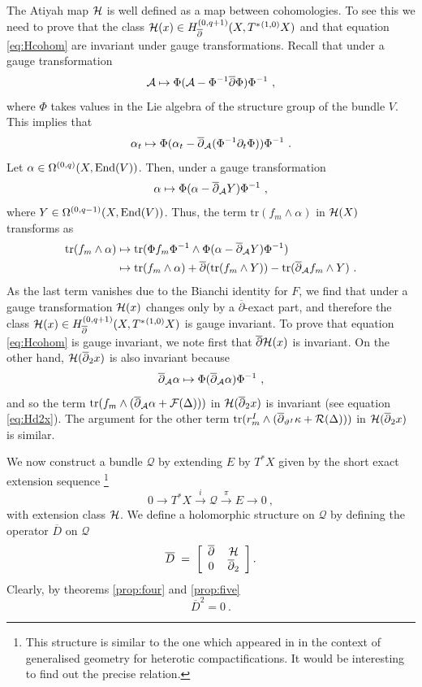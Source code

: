 \documentclass[12pt,a4paper]{article}
\def\bar#1{\overline{#1}}
\let\p=\partial
\def\bp{\bar{\partial}}
\def\tr{\textrm{tr}}
\def\Q{\mathcal{Q}}
\theoremstyle{definition}
\begin{document}
\vskip5pt
The Atiyah map $\cal H$ is well defined as a map between cohomologies.  To see this we need to prove that the class ${\cal H}(x)\in H_{\bp}^{(0,q+1)}(X, T^*{}^{(1,0)}X)$ and that equation \eqref{eq:Hcohom} are invariant under gauge transformations.
Recall that under a gauge transformation
\[ {\cal A} \mapsto \Phi({\cal A} - \Phi^{-1}\bp \Phi)\Phi^{-1}~,\]
where $\Phi$ takes values in the Lie algebra of the structure group of the bundle $V$.  This implies that
\[ \alpha_t \mapsto  \Phi(\alpha_t - \bp_{\cal A}(\Phi^{-1}\p_t \Phi))\Phi^{-1}~.\]
Let $\alpha\in\Omega^{(0,q)}(X, {\rm End}(V))$.  Then, under a gauge transformation
\[ \alpha \mapsto \Phi(\alpha - \bp_{\cal A}Y)\Phi^{-1}~,\]
where $Y\in\Omega^{(0,q-1)}(X, {\rm End}(V))$.  Thus, the term $\tr(f_m\wedge\alpha)$ in ${\cal H}(X)$ transforms as
\begin{equation*}
\begin{split}
 \tr(f_m\wedge\alpha)&\mapsto
 \tr(\Phi f_m\Phi^{-1}\wedge\Phi(\alpha - \bp_{\cal A}Y)\Phi^{-1}) \\ 
&\mapsto \tr(f_m\wedge\alpha) + \bp(\tr(f_m\wedge Y)) - \tr(\bp_{\cal A}f_m\wedge Y)~.
 \end{split}
 \end{equation*}
As the last term vanishes due to the Bianchi identity for $F$, we find that under a gauge transformation ${\cal H}(x)$ 
changes only by a $\bp$-exact part, and therefore the class ${\cal H}(x)\in H_{\bp}^{(0,q+1)}(X, T^*{}^{(1,0)}X)$ is gauge invariant. 
To prove that equation \eqref{eq:Hcohom} is gauge invariant, we note first that $\bp{\cal H}(x)$ is invariant.  
On the other hand, ${\cal H}(\bp_2 x)$ is also invariant
because 
\[ \bp_{\cal A}\alpha\mapsto \Phi(\bp_{\cal A}\alpha)\Phi^{-1}~,\]
and so the term $\tr(f_m\wedge(\bp_{\cal A}\alpha + {\cal F}(\Delta)))$ in ${\cal H}(\bp_2 x)$ is invariant (see equation \eqref{eq:Hd2x}).  The argument for the other term $\tr(r^I_m\wedge(\bp_{\vartheta^I}\kappa + {\cal R}(\Delta)))$ in ${\cal H}(\bp_2 x)$ is similar.

We now construct a bundle $\Q$ by extending $E$ by  $T^*X$ given by the short exact extension sequence
\footnote{This structure is similar to the one which appeared in \citep{2013arXiv1304.4294G, 2013arXiv1308.5159B} in the context of generalised geometry for heterotic compactifications.  It would be interesting to find out the precise relation.}
\begin{equation}
0\rightarrow T^*X\xrightarrow{i}\Q \xrightarrow{\pi}E\rightarrow 0\:,
\end{equation}
with extension class $\cal H$.
We define a holomorphic structure on $\Q$ by defining the operator $\bar D$ on $\Q$ 
\begin{equation}
\bar D\;=\; \left[ \begin{array}{cc}
\bp & \,{\cal H} \\
0  & \,\bp_2  \end{array} \right].\label{eq:barD}
\end{equation}
Clearly, by theorems \ref{prop:four} and  \ref{prop:five}
\[ \bar D^2 = 0~.\] 
\end{document}
